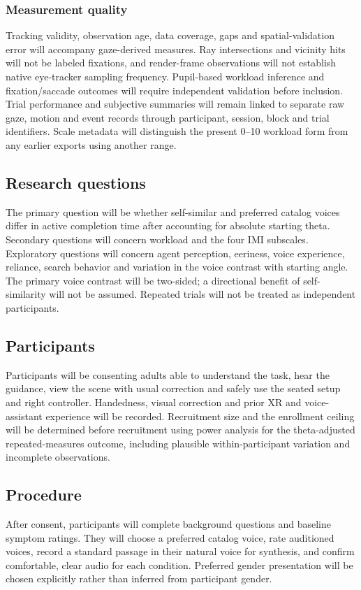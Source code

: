 \documentclass[11pt,letterpaper]{article}
\begin{document}
\subsubsection{Measurement quality}
Tracking validity, observation age, data coverage, gaps and spatial-validation error will accompany gaze-derived measures. Ray intersections and vicinity hits will not be labeled fixations, and render-frame observations will not establish native eye-tracker sampling frequency. Pupil-based workload inference and fixation/saccade outcomes will require independent validation before inclusion. Trial performance and subjective summaries will remain linked to separate raw gaze, motion and event records through participant, session, block and trial identifiers. Scale metadata will distinguish the present 0--10 workload form from any earlier exports using another range.

\subsection{Research questions}
The primary question will be whether self-similar and preferred catalog voices differ in active completion time after accounting for absolute starting theta. Secondary questions will concern workload and the four IMI subscales. Exploratory questions will concern agent perception, eeriness, voice experience, reliance, search behavior and variation in the voice contrast with starting angle. The primary voice contrast will be two-sided; a directional benefit of self-similarity will not be assumed. Repeated trials will not be treated as independent participants.

\subsection{Participants}
Participants will be consenting adults able to understand the task, hear the guidance, view the scene with usual correction and safely use the seated setup and right controller. Handedness, visual correction and prior XR and voice-assistant experience will be recorded. Recruitment size and the enrollment ceiling will be determined before recruitment using power analysis for the theta-adjusted repeated-measures outcome, including plausible within-participant variation and incomplete observations.

\subsection{Procedure}
After consent, participants will complete background questions and baseline symptom ratings. They will choose a preferred catalog voice, rate auditioned voices, record a standard passage in their natural voice for synthesis, and confirm comfortable, clear audio for each condition. Preferred gender presentation will be chosen explicitly rather than inferred from participant gender.
\end{document}
